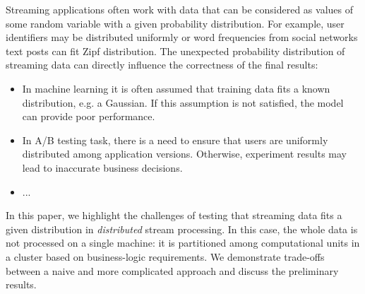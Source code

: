 \label {fs-short-intro}

Streaming applications often work with data that can be considered as values of some random variable with a given probability distribution. For example, user identifiers may be distributed uniformly or word frequencies from social networks text posts can fit Zipf distribution. The unexpected probability distribution of streaming data can directly influence the correctness of the final results:

\begin{itemize}
    \item In machine learning it is often assumed that training data fits a known distribution, e.g. a Gaussian. If this assumption is not satisfied, the model can provide poor performance.
    \item In A/B testing task, there is a need to ensure that users are uniformly distributed among application versions. Otherwise, experiment results may lead to inaccurate business decisions.
    \item ...
\end{itemize}

In this paper, we highlight the challenges of testing that streaming data fits a given distribution in {\em distributed} stream processing. In this case, the whole data is not processed on a single machine: it is partitioned among computational units in a cluster based on business-logic requirements. We demonstrate trade-offs between a naive and more complicated approach and discuss the preliminary results.




